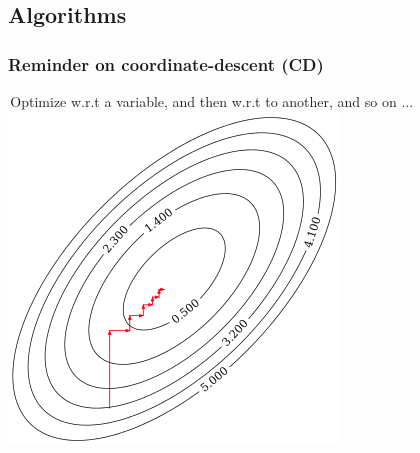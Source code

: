 \documentclass{beamer}
\def\mydot{\structure{\rule{1ex}{1ex}}\,}
\begin{document}
\subsection{Algorithms}
\begin{frame}\frametitle{Reminder on coordinate-descent (CD)}
  \mydot Optimize w.r.t  a variable, and then w.r.t to another, and so on ...
  \centering
\includegraphics[width=0.5\linewidth]{cd.png}
  

\end{frame}
\end{document}
